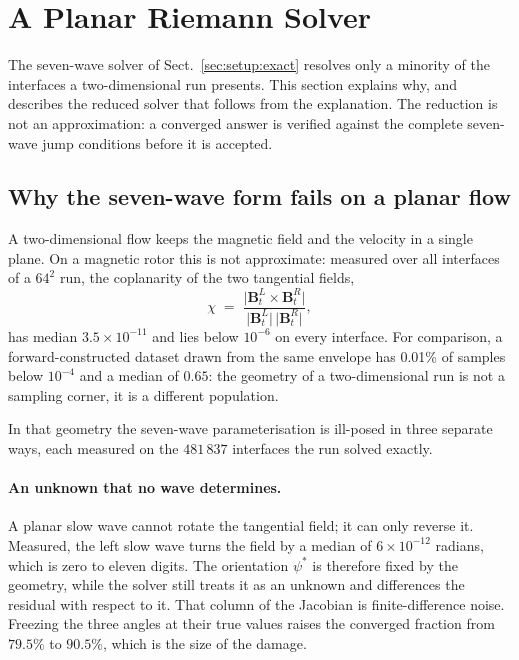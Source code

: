 \section{A Planar Riemann Solver}
\label{sec:planar}

The seven-wave solver of Sect.~\ref{sec:setup:exact} resolves only a minority
of the interfaces a two-dimensional run presents. This section explains why,
and describes the reduced solver that follows from the explanation. The
reduction is not an approximation: a converged answer is verified against the
complete seven-wave jump conditions before it is accepted.

\subsection{Why the seven-wave form fails on a planar flow}
\label{sec:planar:why}

A two-dimensional flow keeps the magnetic field and the velocity in a single
plane. On a magnetic rotor this is not approximate: measured over all
interfaces of a $64^2$ run, the coplanarity of the two tangential fields,
%
\begin{equation}
  \chi \;=\;
  \frac{\lvert \mathbf{B}_t^L \times \mathbf{B}_t^R \rvert}
       {\lvert \mathbf{B}_t^L \rvert \, \lvert \mathbf{B}_t^R \rvert},
  \label{eq:coplanarity}
\end{equation}
%
has median $3.5 \times 10^{-11}$ and lies below $10^{-6}$ on every interface.
For comparison, a forward-constructed dataset drawn from the same envelope has
0.01\% of samples below $10^{-4}$ and a median of $0.65$: the geometry of a two-dimensional run is not a
sampling corner, it is a different population.

In that geometry the seven-wave parameterisation is ill-posed in three
separate ways, each measured on the $481\,837$ interfaces the run solved
exactly.

\paragraph{An unknown that no wave determines.}
A planar slow wave cannot rotate the tangential field; it can only reverse it.
Measured, the left slow wave turns the field by a median of $6 \times 10^{-12}$
radians, which is zero to eleven digits. The orientation $\psi^\ast$ is
therefore fixed by the geometry, while the solver still treats it as an
unknown and differences the residual with respect to it. That column of the
Jacobian is finite-difference noise. Freezing the three angles at their true
values raises the converged fraction from $79.5\%$ to $90.5\%$, which is the
size of the damage.

